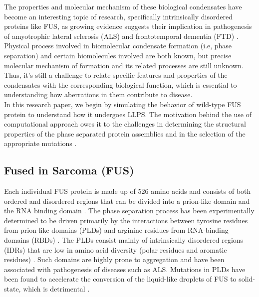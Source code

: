 \documentclass[12ptr]{article}
\begin{document}
The properties and molecular mechanism of these biological condensates have become an interesting topic of research, specifically intrinsically disordered proteins like FUS, as growing evidence suggests their implication in pathogenesis of amyotrophic lateral sclerosis (ALS) and frontotemporal dementia (FTD) \cite{Deng_14}. Physical process involved in biomolecular condensate formation (i.e, phase separation) and certain biomolecules involved are both known, but precise molecular mechanism of formation and its related processes are still unknown. Thus, it’s still a challenge to relate specific features and properties of the condensates with the corresponding biological function, which is essential to understanding how aberrations in them contribute to disease. \\[0.01cm]

In this research paper, we begin by simulating the behavior of wild-type FUS protein to understand how it undergoes LLPS. The motivation behind the use of computational approach owes it to the challenges in determining the structural properties of the phase separated protein assemblies and in the selection of the appropriate mutations \cite{Best_18}.\\[0.01cm]

\subsection{Fused in Sarcoma (FUS)}

Each individual FUS protein is made up of 526 amino acids and consists of both ordered and disordered regions that can be divided into a prion-like domain and the RNA binding domain \cite{Murray_17}. The phase separation process has been experimentally determined to be driven primarily by the interactions between tyrosine residues from prion-like domains (PLDs) and arginine residues from RNA-binding domains (RBDs) \cite{Wang_18}. The PLDs consist mainly of intrinsically disordered regions (IDRs) that are low in amino acid diversity (polar residues and aromatic residues) \cite{Wang_18}. Such domains are highly prone to aggregation and have been associated with pathogenesis of diseases such as ALS. Mutations in PLDs have been found to accelerate the conversion of the liquid-like droplets of FUS to solid-state, which is detrimental \cite{Patel_15}.

\newpage
\end{document}
